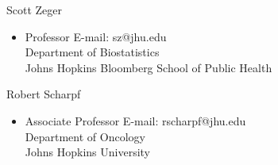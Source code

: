 \documentclass[10pt]{article}
\renewcommand{\section}[1]{\pagebreak[3]%
    \hyphenpenalty=10000%
    \vspace{1.3\baselineskip}%
    \phantomsection\addcontentsline{toc}{section}{#1}%
    \noindent\llap{\scshape\smash{\parbox[t]{\marginparwidth}{\raggedright #1}}}%
    \vspace{-\baselineskip}\par}
\newenvironment{innerlist}[1][\enskip\textbullet]%
        {\begin{itemize}[#1,leftmargin=*,parsep=0pt,itemsep=0pt,topsep=0pt,partopsep=0pt]}
        {\end{itemize}}
\newcommand{\halfblankline}{\quad\vspace{-0.5\baselineskip}\pagebreak[3]}
\begin{document}
\halfblankline

Scott Zeger
\begin{innerlist}
\item[] Professor \hfill{E-mail: sz@jhu.edu}\\
Department of Biostatistics\\
Johns Hopkins Bloomberg School of Public Health
\end{innerlist}

\halfblankline

Robert Scharpf
\begin{innerlist}
\item[] Associate Professor \hfill{E-mail: rscharpf@jhu.edu}\\
Department of Oncology\\
Johns Hopkins University
\end{innerlist}


\begin{comment}
Computer Programming:
%
\begin{innerlist}
    \item R, UNIX shell scripting (including POSIX.2)
\end{innerlist}

\halfblankline
\end{comment}
\end{document}
